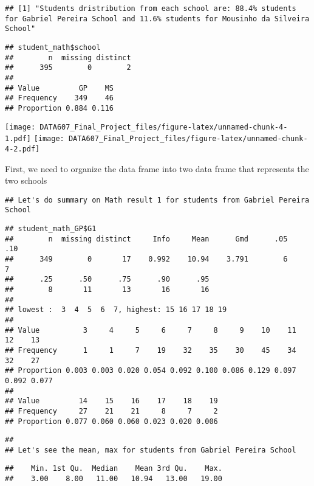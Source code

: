 \documentclass[
]{article}
\begin{document}
\begin{verbatim}
## [1] "Students dristribution from each school are: 88.4% students for Gabriel Pereira School and 11.6% students for Mousinho da Silveira School"
\end{verbatim}

\begin{verbatim}
## student_math$school 
##        n  missing distinct 
##      395        0        2 
##                       
## Value         GP    MS
## Frequency    349    46
## Proportion 0.884 0.116
\end{verbatim}

\texttt{[image: DATA607\_Final\_Project\_files/figure-latex/unnamed-chunk-4-1.pdf]}
\texttt{[image: DATA607\_Final\_Project\_files/figure-latex/unnamed-chunk-4-2.pdf]}

First, we need to organize the data frame into two data frame that
represents the two schools

\begin{verbatim}
## Let's do summary on Math result 1 for students from Gabriel Pereira School
\end{verbatim}

\begin{verbatim}
## student_math_GP$G1 
##        n  missing distinct     Info     Mean      Gmd      .05      .10 
##      349        0       17    0.992    10.94    3.791        6        7 
##      .25      .50      .75      .90      .95 
##        8       11       13       16       16 
## 
## lowest :  3  4  5  6  7, highest: 15 16 17 18 19
##                                                                             
## Value          3     4     5     6     7     8     9    10    11    12    13
## Frequency      1     1     7    19    32    35    30    45    34    32    27
## Proportion 0.003 0.003 0.020 0.054 0.092 0.100 0.086 0.129 0.097 0.092 0.077
##                                               
## Value         14    15    16    17    18    19
## Frequency     27    21    21     8     7     2
## Proportion 0.077 0.060 0.060 0.023 0.020 0.006
\end{verbatim}

\begin{verbatim}
## 
## Let's see the mean, max for students from Gabriel Pereira School
\end{verbatim}

\begin{verbatim}
##    Min. 1st Qu.  Median    Mean 3rd Qu.    Max. 
##    3.00    8.00   11.00   10.94   13.00   19.00
\end{verbatim}
\end{document}
